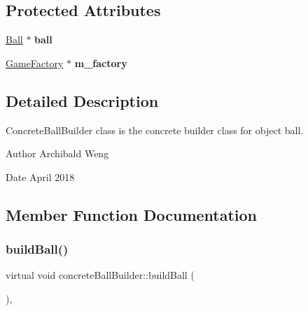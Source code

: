 \subsection*{Protected Attributes}
\begin{DoxyCompactItemize}
\item 
\mbox{\label{classconcrete_ball_builder_aa2a91379bfc8d7ffcece63ff69ff7940}} 
\mbox{\hyperlink{class_ball}{Ball}} $\ast$ {\bfseries ball}
\item 
\mbox{\label{classconcrete_ball_builder_a6d70af8ab25d8143a26d18cd65476290}} 
\mbox{\hyperlink{class_game_factory}{Game\+Factory}} $\ast$ {\bfseries m\+\_\+factory}
\end{DoxyCompactItemize}


\subsection{Detailed Description}
Concrete\+Ball\+Builder class is the concrete builder class for object ball. 

\begin{DoxyAuthor}{Author}
Archibald Weng 
\end{DoxyAuthor}
\begin{DoxyDate}{Date}
April 2018 
\end{DoxyDate}


\subsection{Member Function Documentation}
\mbox{\label{classconcrete_ball_builder_a882e6217ebab232ee2a3d0af63c43b5a}} 
\subsubsection{\texorpdfstring{build\+Ball()}{buildBall()}}
{\footnotesize\ttfamily virtual void concrete\+Ball\+Builder\+::build\+Ball (\begin{DoxyParamCaption}{ }\end{DoxyParamCaption})\hspace{0.3cm}{\ttfamily [inline]}, {\ttfamily [virtual]}}

